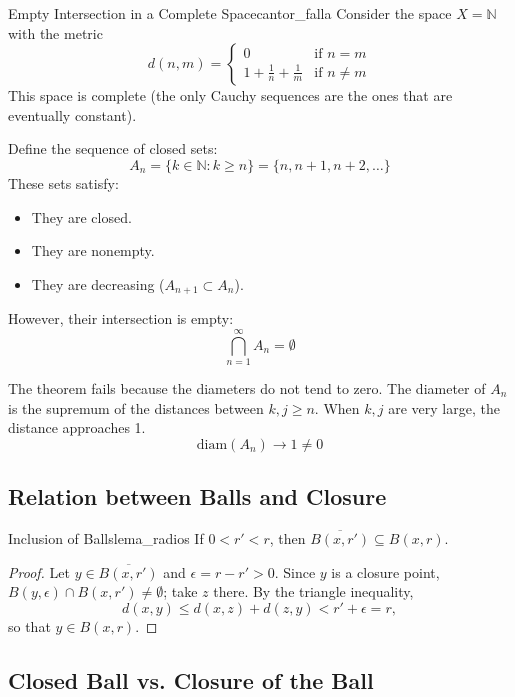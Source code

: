 \documentclass[11pt, a4paper]{article}
\begin{document}
\begin{ejemplo}{Empty Intersection in a Complete Space}{cantor_falla}
Consider the space $X = \mathbb{N}$ with the metric
$$ d(n, m) = \begin{cases} 0 & \text{if } n=m \\ 1 + \frac{1}{n} + \frac{1}{m} & \text{if } n \neq m
\end{cases} $$
This space is complete (the only Cauchy sequences are the ones that are eventually constant).

Define the sequence of closed sets:
$$ A_n = \{ k \in \mathbb{N} : k \ge n \} = \{ n, n+1, n+2, \dots \} $$
These sets satisfy:
\begin{itemize}
    \item They are closed.
    \item They are nonempty.
    \item They are decreasing ($A_{n+1} \subset A_n$).
\end{itemize}
However, their intersection is empty:
$$ \bigcap_{n=1}^{\infty} A_n = \emptyset $$

The theorem fails because the diameters do not tend to zero.
The diameter of $A_n$ is the supremum of the distances between $k, j \ge n$. When $k, j$ are very
large, the distance approaches 1.
$$ \text{diam}(A_n) \to 1 \neq 0 $$
\end{ejemplo}

\subsection{Relation between Balls and Closure}

\begin{proposicion}{Inclusion of Balls}{lema_radios}
If $0 < r' < r$, then $\overline{B(x, r')} \subseteq B(x, r)$.
\end{proposicion}

\begin{proof}
Let $y \in \overline{B(x, r')}$ and $\epsilon = r - r' > 0$. Since $y$ is a closure point,
$B(y, \epsilon) \cap B(x, r') \ne \emptyset$; take $z$ there. By the triangle inequality,
$$ d(x, y) \le d(x, z) + d(z, y) < r' + \epsilon = r, $$
so that $y \in B(x, r)$.
\end{proof}

\subsection{Closed Ball vs. Closure of the Ball}
\end{document}
